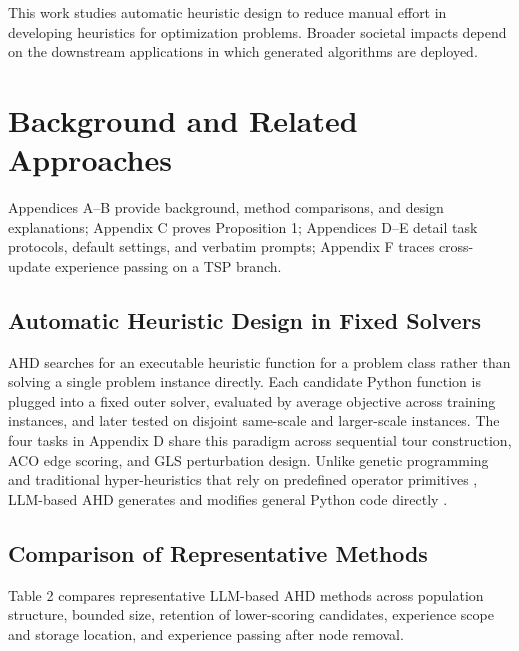 \documentclass{article}
\begin{document}
This work studies automatic heuristic design to reduce manual effort in developing heuristics for optimization problems. Broader societal impacts depend on the downstream applications in which generated algorithms are deployed.

\FloatBarrier
\label{evotrace-main-end}



\clearpage
\onecolumn
\raggedbottom
\appendix
\section{Background and Related Approaches}\label{background-and-related-approaches}

Appendices A--B provide background, method comparisons, and design explanations; Appendix C proves Proposition 1; Appendices D--E detail task protocols, default settings, and verbatim prompts; Appendix F traces cross-update experience passing on a TSP branch.

\subsection{Automatic Heuristic Design in Fixed Solvers}\label{automatic-heuristic-design-in-fixed-solvers}

AHD searches for an executable heuristic function for a problem class rather than solving a single problem instance directly. Each candidate Python function is plugged into a fixed outer solver, evaluated by average objective across training instances, and later tested on disjoint same-scale and larger-scale instances. The four tasks in Appendix D share this paradigm across sequential tour construction, ACO edge scoring, and GLS perturbation design. Unlike genetic programming and traditional hyper-heuristics that rely on predefined operator primitives \citep{koza, hh}, LLM-based AHD generates and modifies general Python code directly \citep{funsearch, eoh}.

\subsection{Comparison of Representative Methods}\label{comparison-of-representative-methods}

Table 2 compares representative LLM-based AHD methods across population structure, bounded size, retention of lower-scoring candidates, experience scope and storage location, and experience passing after node removal.
\end{document}
